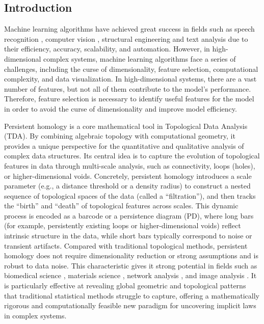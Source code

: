 \documentclass[5GeSdc,ASOC,numref,printGA,printHL,CASflow,nocrossmark,longtitle,PROOF]{/usr/local/texlive/iTemplates/01-Templates/01-Els-Jnl/01-Standard_Templates/V1/ELS_MDL5-V1-6}
\begin{document}
\maketitle
\begin{articlestyle}



\section{Introduction}\label{sec1}

Machine learning algorithms have achieved great success in fields such as speech recognition \cite{mehrish2023review,orken2022study}, computer vision \cite{han2022survey}, structural engineering \cite{ren2025machine,ghannadi2023review} and text analysis \cite{zhang2023survey} due to their efficiency, accuracy, scalability, and automation. However, in high-dimensional complex systems, machine learning algorithms face a series of challenges, including the curse of dimensionality, feature selection, computational complexity, and data visualization. In high-dimensional systems, there are a vast number of features, but not all of them contribute to the model's performance. Therefore, feature selection is necessary to identify useful features for the model in order to avoid the curse of dimensionality and improve model efficiency. 

{
Persistent homology is a core mathematical tool in Topological Data Analysis (TDA). By combining algebraic topology with computational geometry, it provides a unique perspective for the quantitative and qualitative analysis of complex data structures. Its central idea is to capture the evolution of topological features in data through multi-scale analysis, such as connectivity, loops (holes), or higher-dimensional voids. Concretely, persistent homology introduces a scale parameter (e.g., a distance threshold or a density radius) to construct a nested sequence of topological spaces of the data (called a ``filtration''), and then tracks the ``birth'' and ``death'' of topological features across scales. This dynamic process is encoded as a barcode or a persistence diagram (PD), where long bars (for example, persistently existing loops or higher-dimensional voids) reflect intrinsic structure in the data, while short bars typically correspond to noise or transient artifacts. Compared with traditional topological methods, persistent homology does not require dimensionality reduction or strong assumptions and is robust to data noise. This characteristic gives it strong potential in fields such as biomedical science \cite{lawson2019persistent}, materials science \cite{kramar2013persistence}, network analysis \cite{nguyen2020bot,aktas2019persistence}, and image analysis \cite{clough2020topological}. It is particularly effective at revealing global geometric and topological patterns that traditional statistical methods struggle to capture, offering a mathematically rigorous and computationally feasible new paradigm for uncovering implicit laws in complex systems.}


\end{articlestyle}
\end{document}
